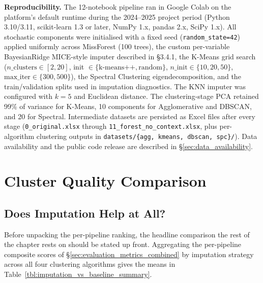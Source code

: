 \textbf{Reproducibility.} The 12-notebook pipeline ran in Google Colab on the platform's default runtime during the 2024--2025 project period (Python 3.10/3.11, scikit-learn 1.3 or later, NumPy 1.x, pandas 2.x, SciPy 1.x). All stochastic components were initialised with a fixed seed (\texttt{random\_state=42}) applied uniformly across MissForest (100 trees), the custom per-variable BayesianRidge MICE-style imputer described in \S3.4.1, the K-Means grid search ($n\_\mathrm{clusters} \in [2, 20]$, init $\in \{\text{k-means++}, \text{random}\}$, $n\_\mathrm{init} \in \{10, 20, 50\}$, $\mathrm{max\_iter} \in \{300, 500\}$), the Spectral Clustering eigendecomposition, and the train/validation splits used in imputation diagnostics. The KNN imputer was configured with $k = 5$ and Euclidean distance. The clustering-stage PCA retained 99\% of variance for K-Means, 10 components for Agglomerative and DBSCAN, and 20 for Spectral. Intermediate datasets are persisted as Excel files after every stage (\texttt{0\_original.xlsx} through \texttt{11\_forest\_no\_context.xlsx}, plus per-algorithm clustering outputs in \texttt{datasets/\{agg, kmeans, dbscan, spc\}/}). Data availability and the public code release are described in \S\ref{sec:data_availability}.

\section{Cluster Quality Comparison}

\subsection{Does Imputation Help at All?}\label{sec:imputation_baseline_comparison}

Before unpacking the per-pipeline ranking, the headline comparison the rest of the chapter rests on should be stated up front. Aggregating the per-pipeline composite scores of \S\ref{sec:evaluation_metrics_combined} by imputation strategy across all four clustering algorithms gives the means in Table~\ref{tbl:imputation_vs_baseline_summary}.

